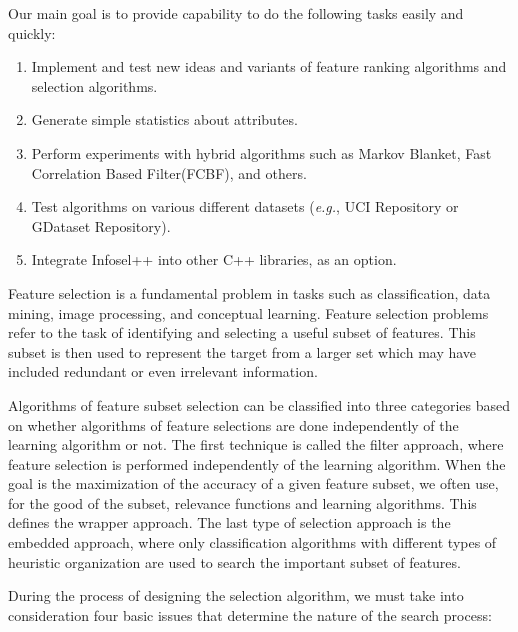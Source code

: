 \documentclass[a4paper,fleqn]{report}
\begin{document}
Our main goal is to provide capability to do the following tasks easily and quickly:

\begin{enumerate}
\item Implement and test new ideas and variants of feature ranking algorithms and selection algorithms.
\item Generate simple statistics about attributes.
\item Perform experiments with hybrid algorithms such as Markov Blanket, Fast Correlation Based Filter(FCBF), and others.
\item Test algorithms on various different datasets ({\it e.g.}, UCI Repository or GDataset Repository).
\item Integrate Infosel++ into other C++ libraries, as an option.
\end{enumerate}


Feature selection is a fundamental problem in tasks such as classification, data mining, image processing, and conceptual learning. 
Feature selection problems refer to the task of identifying and selecting a 
useful subset of features. This subset is then used to represent the target from a larger set which may have included 
redundant or even irrelevant information.

Algorithms of feature subset selection can be classified into three categories based on whether algorithms of feature selections 
are done independently of the learning algorithm or not. The first technique is called the filter approach, where feature selection 
is performed independently of the learning algorithm. When the goal is the maximization of the accuracy of a given feature subset, 
we often use, for the good of the subset, relevance functions and learning algorithms. This defines the wrapper approach. 
The last type of selection approach is the embedded approach, where only classification algorithms with different types 
of heuristic organization are used to search the important subset of features.

During the process of designing the selection algorithm, we must take into consideration four basic issues that determine the nature 
of the search process:
\end{document}
